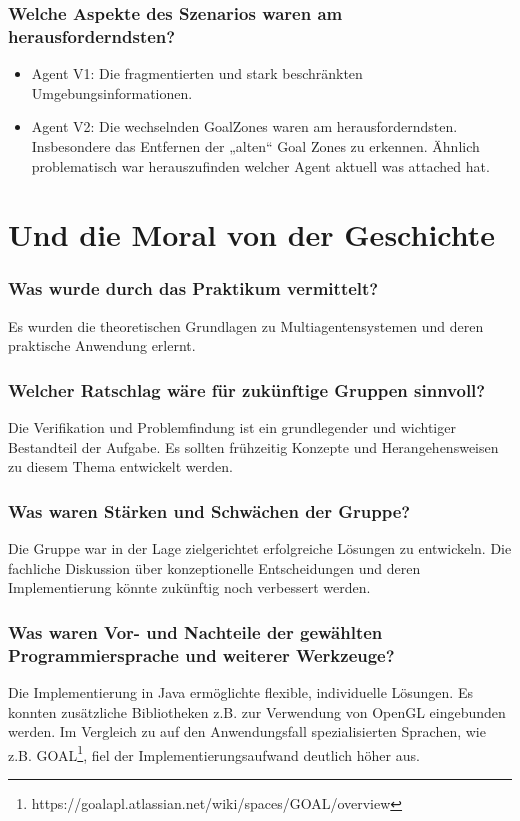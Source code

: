\documentclass[runningheads]{llncs}
\begin{document}
	\subsubsection{Welche Aspekte des Szenarios waren am herausforderndsten?}
	\begin{itemize}
		\item Agent V1: Die fragmentierten und stark beschränkten Umgebungsinformationen. 
		\item Agent V2: Die wechselnden GoalZones waren am herausforderndsten. Insbesondere das Entfernen der „alten“ Goal Zones zu erkennen. Ähnlich problematisch war herauszufinden welcher Agent aktuell was attached hat.
	\end{itemize}
	
	\section{Und die Moral von der Geschichte}
	\subsubsection{Was wurde durch das Praktikum vermittelt?\\}
	Es wurden die theoretischen Grundlagen zu Multiagentensystemen und deren praktische Anwendung erlernt.
	\subsubsection{Welcher Ratschlag wäre für zukünftige Gruppen sinnvoll?\\}
	Die Verifikation und Problemfindung ist ein grundlegender und wichtiger Bestandteil der Aufgabe. Es sollten frühzeitig Konzepte und Herangehensweisen zu diesem Thema entwickelt werden.
	
	\subsubsection{Was waren Stärken und Schwächen der Gruppe?\\}
	Die Gruppe war in der Lage zielgerichtet erfolgreiche Lösungen zu entwickeln. Die fachliche Diskussion über konzeptionelle Entscheidungen und deren Implementierung könnte zukünftig noch verbessert werden.   
	
	\subsubsection{Was waren Vor- und Nachteile der gewählten Programmiersprache und weiterer Werkzeuge?\\}
	Die Implementierung in Java ermöglichte flexible, individuelle Lösungen. Es konnten zusätzliche Bibliotheken z.B. zur Verwendung von OpenGL eingebunden werden. Im Vergleich zu auf den Anwendungsfall spezialisierten Sprachen, wie z.B. GOAL\footnote{https://goalapl.atlassian.net/wiki/spaces/GOAL/overview}, fiel der Implementierungsaufwand deutlich höher aus.
	
\end{document}
